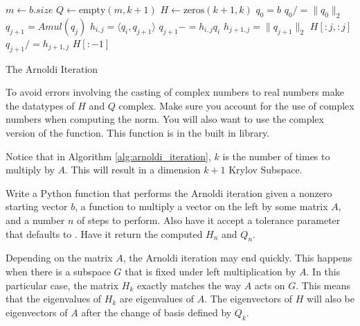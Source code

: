 \begin{algorithm}
\begin{algorithmic}[1]
	\State $m \gets b.size$						
	\State $Q \gets \text{empty}\left(m, k+1\right)$
	\State $H \gets \text{zeros}\left( k+1, k\right)$
	\State $q_0 = b$							
	\State $q_0 /= \|q_0\|_2$						
								
		\State $q_{j+1} = Amul \left(q_j\right)$		
							
			\State $h_{i,j} = \langle q_i, q_{j+1}\rangle$		
			\State $q_{j+1} -= h_{i,j} q_i$
		\EndFor
		\State $h_{j+1,j} = \|q_{j+1}\|_2$			
            					
			\State {} $H[:j,:j]$
		\EndIf
		\State $q_{j+1} /= h_{j+1,j}$				
	\EndFor
	\State {} $H[:-1]$				
\EndProcedure
\end{algorithmic}
\caption{The Arnoldi Iteration}
\label{alg:arnoldi_iteration}
\end{algorithm}

\begin{warn}
To avoid errors involving the casting of complex numbers to real numbers make the datatypes of $H$ and $Q$ complex.
Make sure you account for the use of complex numbers when computing the norm.
You will also want to use the complex version of the  function.
This function is in the built in  library.
\end{warn}

Notice that in Algorithm \ref{alg:arnoldi_iteration}, $k$ is the number of times to multiply by $A$.
This will result in a dimension $k+1$ Krylov Subspace.

\begin{problem}
Write a Python function that performs the Arnoldi iteration given a nonzero starting vector $b$, a function to multiply a
vector on the left by some matrix $A$, and a number $n$ of steps to perform.
Also have it accept a tolerance parameter that defaults to .
Have it return the computed $H_n$ and $Q_n$.
\end{problem}

\begin{info}
Depending on the matrix $A$, the Arnoldi iteration may end quickly.
This happens when there is a subspace $G$ that is fixed under left multiplication by $A$.
In this particular case, the matrix $H_k$ exactly matches the way $A$ acts on $G$.
This means that the eigenvalues of $H_k$ are eigenvalues of $A$.
The eigenvectors of $H$ will also be eigenvectors of $A$ after the change of basis defined by $Q_k$.
\end{info}

